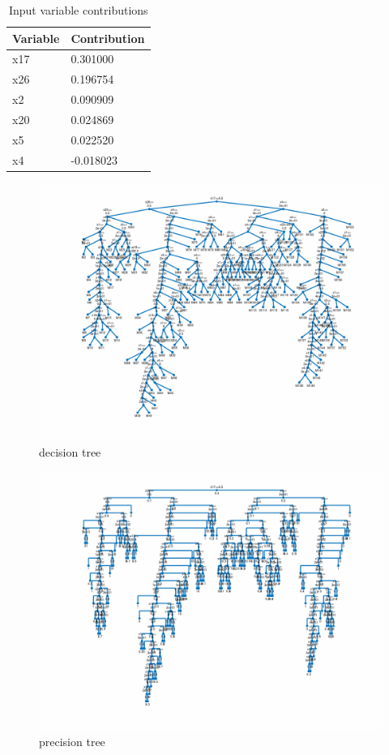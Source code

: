 \documentclass{article}
\begin{document}
\begin{table}[H]
	\centering
	\caption{Input variable contributions}
	\label{tab:Variable-Contribution}
	\begin{tabular}{|l|l|}
		\hline
		\textbf{Variable}   & \textbf{Contribution}	\\ \hline
		x17	       			& 0.301000 				\\ \hline
		x26	       			& 0.196754 				\\ \hline
		x2	       			& 0.090909 				\\ \hline
		x20	       			& 0.024869				\\ \hline
		x5	       			& 0.022520 				\\ \hline
		x4	       			& -0.018023 			\\ \hline
	\end{tabular}
\end{table}
\newpage
\vfill
\begin{figure}
	\includegraphics[width=\textwidth,height=\textheight,keepaspectratio]{decision_tree.png}
	\caption{decision tree}
\end{figure}	
\begin{figure}
	\centering
	\includegraphics[width=\textwidth,height=\textheight,keepaspectratio]{precision_tree.png}
	\caption{precision tree}
\end{figure}
\vfill
\clearpage
\end{document}

